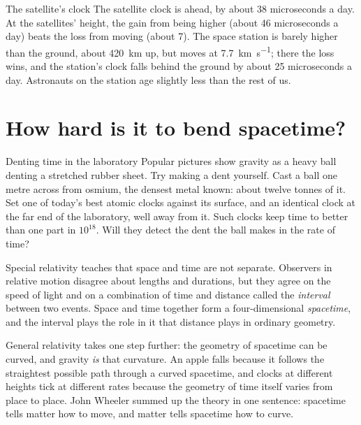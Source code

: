 \begin{revisited}{The satellite's clock}
The satellite clock is ahead, by about 38 microseconds a day. At the
satellites' height, the gain from being higher (about 46 microseconds a day)
beats the loss from moving (about 7). The space station is barely higher than
the ground, about \SI{420}{\kilo\metre} up, but moves at
\SI{7.7}{\kilo\metre\per\second}; there the loss wins, and the station's clock
falls behind the ground by about 25 microseconds a day. Astronauts on the
station age slightly less than the rest of us.
\end{revisited}

\section{How hard is it to bend spacetime?}\label{sec:stiff}

\begin{thought}{Denting time in the laboratory}
Popular pictures show gravity as a heavy ball denting a stretched rubber
sheet. Try making a dent yourself. Cast a ball one metre across from osmium,
the densest metal known: about twelve tonnes of it. Set one of today's best
atomic clocks against its surface, and an identical clock at the far end of
the laboratory, well away from it. Such clocks keep time to better than one
part in $10^{18}$. Will they detect the dent the ball makes in the rate of
time?
\end{thought}

Special relativity teaches that space and time are not separate. Observers in
relative motion disagree about lengths and durations, but they agree on the
speed of light and on a combination of time and distance called the
\emph{interval} between two events. Space and time together form a
four-dimensional \emph{spacetime}, and the interval plays the role in it that
distance plays in ordinary geometry.

General relativity takes one step further: the geometry of spacetime can be
curved, and gravity \emph{is} that curvature. An apple falls because it
follows the straightest possible path through a curved spacetime, and clocks
at different heights tick at different rates because the geometry of time
itself varies from place to place. John Wheeler summed up the theory in one
sentence: spacetime tells matter how to move, and matter tells spacetime how
to curve.

